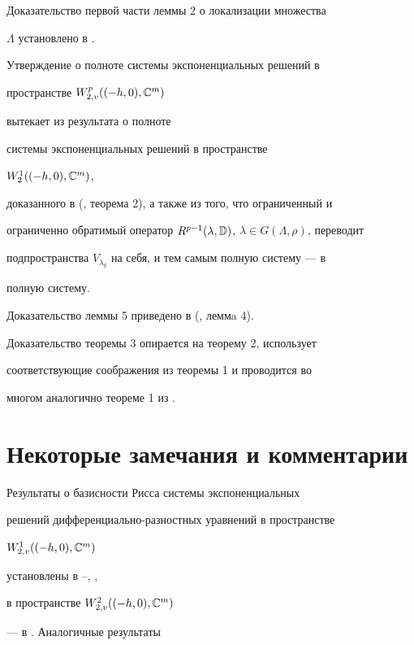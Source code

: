  


Доказательство первой части леммы 2 о локализации множества 


$\Lambda$ установлено в \cite{5}. 


Утверждение о полноте системы экспоненциальных решений в 


пространстве $W^p_{2,v}((-h,0),\Bbb C^m)$ 


вытекает из результата о полноте 


системы экспоненциальных решений в пространстве \linebreak


$W^1_2((-h,0),\Bbb C^m)$, 


доказанного в (\cite{5}, теорема 2), а также из того, что ограниченный и 


ограниченно обратимый оператор $R^{p-1}(\lambda,\Bbb D)$, $\lambda\in 


G(\Lambda,\rho)$, переводит 


подпространства $V_{\lambda_q}$ на себя, и тем самым полную систему --- в 


полную систему. 


 


Доказательство леммы 5 приведено в (\cite{11}, леммa 4). 


 


Доказательство теоремы 3 опирается на теорему 2, использует 


соответствующие соображения из теоремы 1 \cite{10} и проводится во 


многом аналогично теореме 1 из \cite{9}. 


 


\section{Некоторые замечания и комментарии} 


 


Результаты о базисности Рисса системы экспоненциальных 


решений дифференциально-разностных уравнений в пространстве 


$W^1_{2,v}((-h,0),\Bbb C^m)$ 


установлены в \cite{6}--\cite{8}, \cite{11}, 


в пространстве $W^2_{2,v}((-h,0),\Bbb C^m)$ 


--- в \cite{16}. Аналогичные результаты 


